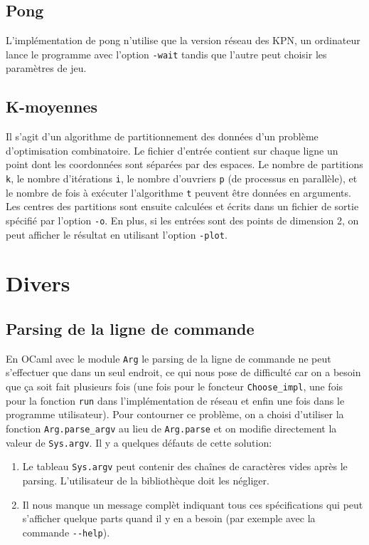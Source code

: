 \subsection{Pong}\label{pong}

L'implémentation de pong n'utilise que la version réseau des KPN, un
ordinateur lance le programme avec l'option \texttt{-wait} tandis que
l'autre peut choisir les paramètres de jeu.

\subsection{K-moyennes}\label{k-moyennes}

Il s'agit d'un algorithme de partitionnement des données d'un problème
d'optimisation combinatoire. Le fichier d'entrée contient sur chaque
ligne un point dont les coordonnées sont séparées par des espaces. Le
nombre de partitions \texttt{k}, le nombre d'itérations \texttt{i}, le
nombre d'ouvriers \texttt{p} (de processus en parallèle), et le nombre
de fois à exécuter l'algorithme \texttt{t} peuvent être données en
arguments. Les centres des partitions sont ensuite calculées et écrits
dans un fichier de sortie spécifié par l'option \texttt{-o}. En plus, si
les entrées sont des points de dimension 2, on peut afficher le résultat
en utilisant l'option \texttt{-plot}.

\section{Divers}\label{divers}

\subsection{Parsing de la ligne de
commande}\label{parsing-de-la-ligne-de-commande}

En OCaml avec le module \texttt{Arg} le parsing de la ligne de commande
ne peut s'effectuer que dans un seul endroit, ce qui nous pose de
difficulté car on a besoin que ça soit fait plusieurs fois (une fois
pour le foncteur \texttt{Choose\_impl}, une fois pour la fonction
\texttt{run} dans l'implémentation de réseau et enfin une fois dans le
programme utilisateur). Pour contourner ce problème, on a choisi
d'utiliser la fonction \texttt{Arg.parse\_argv} au lieu de
\texttt{Arg.parse} et on modifie directement la valeur de
\texttt{Sys.argv}. Il y a quelques défauts de cette solution:

\begin{enumerate}
\def\labelenumi{\arabic{enumi}.}
\item
  Le tableau \texttt{Sys.argv} peut contenir des chaînes de caractères
  vides après le parsing. L'utilisateur de la bibliothèque doit les
  négliger.
\item
  Il nous manque un message complèt indiquant tous ces spécifications
  qui peut s'afficher quelque parts quand il y en a besoin (par exemple
  avec la commande \texttt{-{}-help}).
\end{enumerate}

